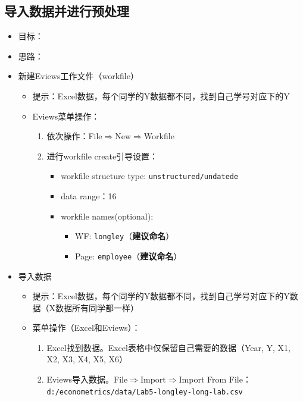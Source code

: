 \documentclass[12pt,(landscape,a4paper),(portrait,a4paper)]{article}
\providecommand{\tightlist}{%
  \setlength{\itemsep}{0pt}\setlength{\parskip}{0pt}}
\begin{document}
\subsection{导入数据并进行预处理}

\begin{itemize}
\tightlist
\item
  目标：
\item
  思路：
\item
  新建Eviews工作文件（workfile）

  \begin{itemize}
  \tightlist
  \item
    提示：Excel数据，每个同学的Y数据都不同，找到自己学号对应下的Y
  \item
    Eviews菜单操作：

    \begin{enumerate}
    \def\labelenumi{\alph{enumi}.}
    \tightlist
    \item
      依次操作：File\(\Rightarrow\)New\(\Rightarrow\)Workfile
    \item
      进行workfile create引导设置：

      \begin{itemize}
      \tightlist
      \item
        workfile structure type: \texttt{unstructured/undatede}
      \item
        data range：16
      \item
        workfile names(optional):

        \begin{itemize}
        \tightlist
        \item
          WF: \texttt{longley}（\textbf{建议命名}）
        \item
          Page: \texttt{employee}（\textbf{建议命名}）
        \end{itemize}
      \end{itemize}
    \end{enumerate}
  \end{itemize}
\item
  导入数据

  \begin{itemize}
  \tightlist
  \item
    提示：Excel数据，每个同学的Y数据都不同，找到自己学号对应下的Y数据（X数据所有同学都一样）\\
  \item
    菜单操作（Excel和Eviews）：

    \begin{enumerate}
    \def\labelenumi{\alph{enumi}.}
    \tightlist
    \item
      Excel找到数据。Excel表格中仅保留自己需要的数据（Year, Y, X1, X2,
      X3, X4, X5, X6）
    \item
      Eviews导入数据。File\(\Rightarrow\)Import\(\Rightarrow\)Import
      From File：\texttt{d:/econometrics/data/Lab5-longley-long-lab.csv}
    \end{enumerate}
  \end{itemize}
\end{itemize}
\end{document}

